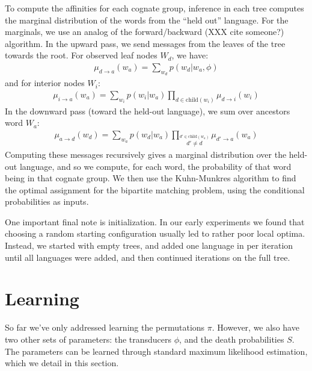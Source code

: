 \documentclass[11pt,a4paper]{article}
\begin{document}
To compute the affinities for each cognate group, inference in each
tree computes the marginal distribution of the words from the ``held
out'' language. For the marginals, we use an analog of the 
forward/backward (XXX cite someone?) algorithm. In the upward pass,
we send messages from the leaves of the tree towards the root. For observed
leaf nodes $W_d$, we have:
\begin{equation*}
  \begin{split}
    \mu_{d\to a}(w_a) = \sum_{w_d} p(w_d|w_a,\phi)
   \end{split}
 \end{equation*}
and for interior nodes $W_i$:
\begin{equation*}
  \begin{split}
    \mu_{i\to a}(w_a) = \sum_{w_i} p(w_i|w_a) \prod_{d \in \mathrm{child}(w_i)} \mu_{d \to i}(w_i) 
  \end{split}
\end{equation*}
In the downward pass (toward the held-out language), we sum over ancestors word $W_a$:
\begin{equation*}
  \begin{split}
    \mu_{a\to d}(w_d) = \sum_{w_a} p(w_d|w_a) \prod_{\stackrel{d' \in \mathrm{child}(w_a)}{d' \neq d}} \mu_{d' \to a}(w_a) 
  \end{split}
\end{equation*}
Computing these messages recursively gives a marginal distribution
over the held-out language, and so we compute, for each word, the
probability of that word being in that cognate group. We then use
the Kuhn-Munkres algorithm \cite{Kuhn1955} to find the optimal
assignment for the bipartite matching problem, using the conditional
probabilities as inputs.

One important final note is initialization. In our early experiments
we found that choosing a random starting configuration usually led
to rather poor local optima. Instead, we started with empty trees,
and added one language in per iteration until all languages were
added, and then continued iterations on the full tree.

\section{Learning} 

So far we've only addressed learning the permutations $\pi$. However,
we also have two other sets of parameters: the transducers $\phi$,
and the death probabilities $S$. The parameters can be learned
through standard maximum likelihood estimation, which we detail in
this section.
\end{document}
